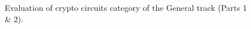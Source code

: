 \begin{figure}
	\noindent{}
	\caption{Evaluation of crypto circuits category of the General track (Parts 1 \& 2).}
	\label{fig:crci-1}
\end{figure}

